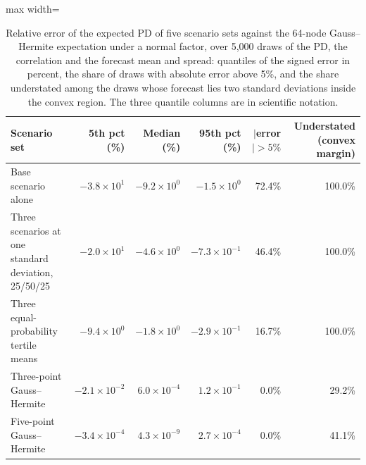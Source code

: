 \begin{table}[htbp]
\centering
\small
\caption{Relative error of the expected PD of five scenario sets against the 64-node Gauss--Hermite expectation under a normal factor, over 5,000 draws of the PD, the correlation and the forecast mean and spread: quantiles of the signed error in percent, the share of draws with absolute error above 5\%, and the share understated among the draws whose forecast lies two standard deviations inside the convex region. The three quantile columns are in scientific notation.}
\label{tab:designs}
\begin{adjustbox}{max width=\textwidth}
\begin{tabular}{p{5.2cm}rrrrr}
\toprule
Scenario set & 5th pct (\%) & Median (\%) & 95th pct (\%) & $|$error$|>5\%$ & Understated (convex margin) \\
\midrule
Base scenario alone & $-3.8\times10^{1}$ & $-9.2\times10^{0}$ & $-1.5\times10^{0}$ & 72.4\% & 100.0\% \\
Three scenarios at one standard deviation, 25/50/25 & $-2.0\times10^{1}$ & $-4.6\times10^{0}$ & $-7.3\times10^{-1}$ & 46.4\% & 100.0\% \\
Three equal-probability tertile means & $-9.4\times10^{0}$ & $-1.8\times10^{0}$ & $-2.9\times10^{-1}$ & 16.7\% & 100.0\% \\
Three-point Gauss--Hermite & $-2.1\times10^{-2}$ & $6.0\times10^{-4}$ & $1.2\times10^{-1}$ & 0.0\% & 29.2\% \\
Five-point Gauss--Hermite & $-3.4\times10^{-4}$ & $4.3\times10^{-9}$ & $2.7\times10^{-4}$ & 0.0\% & 41.1\% \\
\bottomrule
\end{tabular}
\end{adjustbox}
\end{table}
